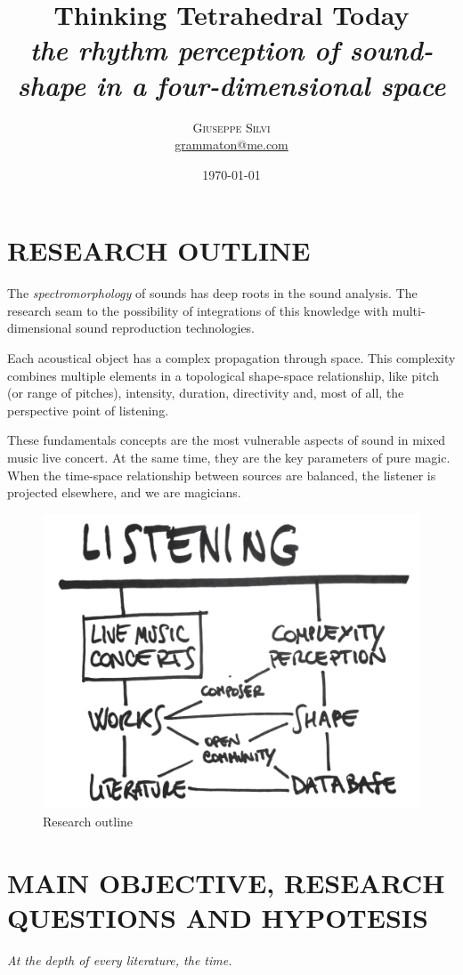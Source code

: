 \documentclass[
	12pt,
	a4paper,
	twocolumn
	]{article}
\title{Thinking Tetrahedral Today \\ \large{\emph{the rhythm perception of sound-shape in a four-dimensional space}}} %
\author{%
\textsc{Giuseppe Silvi}\\[1ex]%
\normalsize \href{mailto:me@giuseppesilvi.com}{grammaton@me.com} %
}
\date{\today} %
\begin{document}
\maketitle
\section*{RESEARCH OUTLINE}
The \emph{spectromorphology} of sounds has deep roots in the sound analysis. \cite{smalley_1997} The research seam to the possibility of integrations of this knowledge with multi-dimensional sound reproduction technologies. \cite{fellgett_75, gerzon_70a, gerzon_70b} 

Each acoustical object has a complex propagation through space. This complexity combines multiple elements in a topological shape-space relationship, like pitch (or range of pitches), intensity, duration, directivity and, most of all, the perspective point of listening. 

These fundamentals concepts are the most vulnerable aspects of sound in mixed music live concert. At the same time, they are the key parameters of pure magic. When the time-space relationship between sources are balanced, the listener is projected elsewhere, and we are magicians.


\begin{figure}[htbp]
\centering
\includegraphics[width=.47\textwidth]{img/2020-01-20-14-20.jpg}
\caption{Research outline}
\label{outline}
\end{figure}

\section*{MAIN OBJECTIVE, RESEARCH \\ QUESTIONS AND HYPOTESIS}
%
\emph{At the depth of every literature, the time.}
\end{document}
